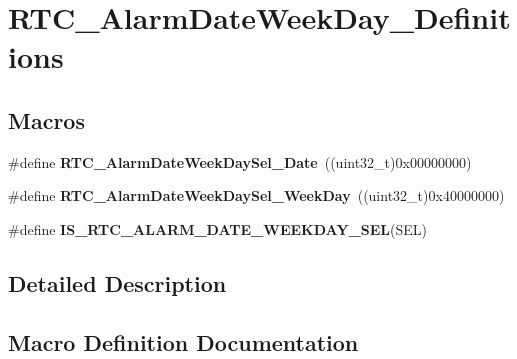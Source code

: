 \hypertarget{group___r_t_c___alarm_date_week_day___definitions}{}\section{R\+T\+C\+\_\+\+Alarm\+Date\+Week\+Day\+\_\+\+Definitions}
\label{group___r_t_c___alarm_date_week_day___definitions}
\subsection*{Macros}
\begin{DoxyCompactItemize}
\item 
\hypertarget{group___r_t_c___alarm_date_week_day___definitions_ga45ef2c9d40689e0f89bea8c92b6c9a60}{}\#define {\bfseries R\+T\+C\+\_\+\+Alarm\+Date\+Week\+Day\+Sel\+\_\+\+Date}~((uint32\+\_\+t)0x00000000)\label{group___r_t_c___alarm_date_week_day___definitions_ga45ef2c9d40689e0f89bea8c92b6c9a60}

\item 
\hypertarget{group___r_t_c___alarm_date_week_day___definitions_ga1e4d253a3bc6210e6b6af62a1d0fc4d8}{}\#define {\bfseries R\+T\+C\+\_\+\+Alarm\+Date\+Week\+Day\+Sel\+\_\+\+Week\+Day}~((uint32\+\_\+t)0x40000000)\label{group___r_t_c___alarm_date_week_day___definitions_ga1e4d253a3bc6210e6b6af62a1d0fc4d8}

\item 
\#define {\bfseries I\+S\+\_\+\+R\+T\+C\+\_\+\+A\+L\+A\+R\+M\+\_\+\+D\+A\+T\+E\+\_\+\+W\+E\+E\+K\+D\+A\+Y\+\_\+\+S\+E\+L}(S\+E\+L)
\end{DoxyCompactItemize}


\subsection{Detailed Description}


\subsection{Macro Definition Documentation}
\hypertarget{group___r_t_c___alarm_date_week_day___definitions_gac5d3e2182217ad6c5a75eba5c88cb335}{}

